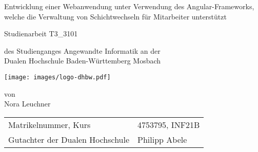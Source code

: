 \def\doctype{Dokumententyp}
\def\title{Entwicklung einer Webanwendung unter Verwendung des Angular-Frameworks,
welche die Verwaltung von Schichtwechseln für Mitarbeiter unterstützt}
\def\author{Nora Leuchner}

\begin{titlepage}

	\vspace{9mm}

	\begin{center}
		\vspace{5mm}

		\huge \title

		\vspace{13.2pt}


		\vspace{42.6pt}

		\large Studienarbeit T3\_3101

		\vspace{42.6pt}

		\small des Studienganges Angewandte Informatik an der \\
		\large Dualen Hochschule Baden-Württemberg Mosbach

		\vspace{14.2pt}

		\texttt{[image: images/logo-dhbw.pdf]}

		\vspace{42.6pt}

		\small von \\
		\large \author
	\end{center}

	\vspace{110pt}

	\begin{table}[h]
		\centering
		\begin{tabular}{ll}
			\small Matrikelnummer, Kurs            & 4753795, INF21B \\
			\small Gutachter der Dualen Hochschule & Philipp Abele   \\
		\end{tabular}
	\end{table}

	\vspace{49.7pt}


\end{titlepage}